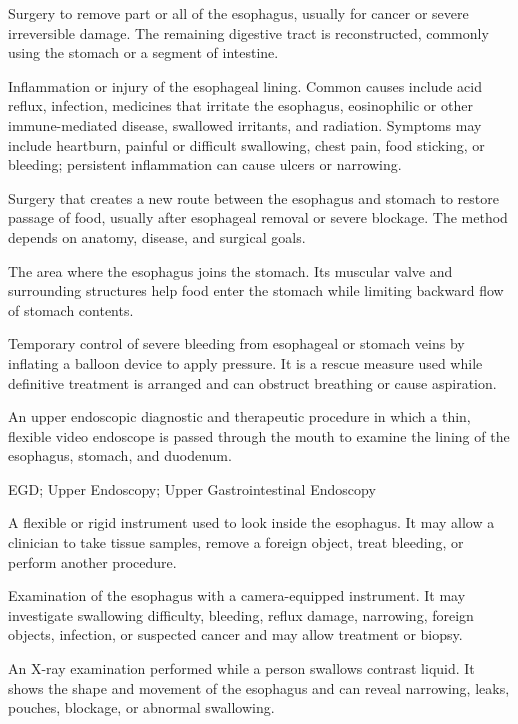  Surgery to remove part or all of the esophagus, usually for cancer or severe irreversible damage. The remaining digestive tract is reconstructed, commonly using the stomach or a segment of intestine.

 Inflammation or injury of the esophageal lining. Common causes include acid reflux, infection, medicines that irritate the esophagus, eosinophilic or other immune-mediated disease, swallowed irritants, and radiation. Symptoms may include heartburn, painful or difficult swallowing, chest pain, food sticking, or bleeding; persistent inflammation can cause ulcers or narrowing.

 Surgery that creates a new route between the esophagus and stomach to restore passage of food, usually after esophageal removal or severe blockage. The method depends on anatomy, disease, and surgical goals.

 The area where the esophagus joins the stomach. Its muscular valve and surrounding structures help food enter the stomach while limiting backward flow of stomach contents.

 Temporary control of severe bleeding from esophageal or stomach veins by inflating a balloon device to apply pressure. It is a rescue measure used while definitive treatment is arranged and can obstruct breathing or cause aspiration.

 An upper endoscopic diagnostic and therapeutic procedure in which a thin, flexible video endoscope is passed through the mouth to examine the lining of the esophagus, stomach, and duodenum.

\synonyms
EGD; Upper Endoscopy; Upper Gastrointestinal Endoscopy

 A flexible or rigid instrument used to look inside the esophagus. It may allow a clinician to take tissue samples, remove a foreign object, treat bleeding, or perform another procedure.

 Examination of the esophagus with a camera-equipped instrument. It may investigate swallowing difficulty, bleeding, reflux damage, narrowing, foreign objects, infection, or suspected cancer and may allow treatment or biopsy.

 An X-ray examination performed while a person swallows contrast liquid. It shows the shape and movement of the esophagus and can reveal narrowing, leaks, pouches, blockage, or abnormal swallowing.

